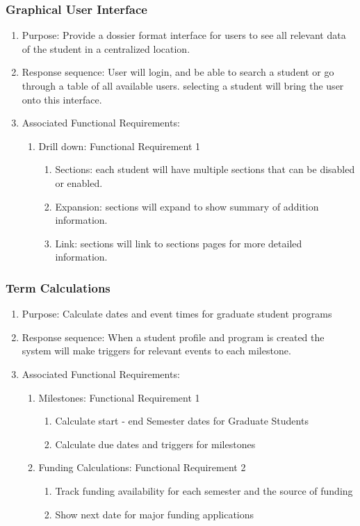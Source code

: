 \documentclass{journal}
\begin{document}
\subsubsection{Graphical User Interface}
\begin{enumerate}
\item Purpose: Provide a dossier format interface for users to see all relevant data of the student in a centralized location.
\item Response sequence: User will login, and be able to search a student or go through a table of all available users. selecting a student will bring the user onto this interface.
\item Associated Functional Requirements:
\begin{enumerate}
\item Drill down: Functional Requirement 1
\begin{enumerate}
\item Sections: each student will have multiple sections that can be disabled or enabled.
\item Expansion: sections will expand to show summary of addition information.
\item Link: sections will link to sections pages for more detailed information.
\end{enumerate}
\end{enumerate}
\end{enumerate}
\subsubsection{Term Calculations}
\begin{enumerate}
\item Purpose: Calculate dates and event times for graduate student programs 
\item Response sequence: When a student profile and program is created the system will make triggers for relevant events to each milestone.
\item Associated Functional Requirements:
\begin{enumerate}
\item Milestones: Functional Requirement 1
\begin{enumerate}
\item Calculate start - end  Semester dates for Graduate Students
\item Calculate due dates and triggers for milestones
\end{enumerate}
\item Funding Calculations: Functional Requirement 2
\begin{enumerate}
\item Track funding availability for each semester and the source of funding
\item Show next date for major funding applications
\end{enumerate}
\end{enumerate}
\end{enumerate}
\end{document}
